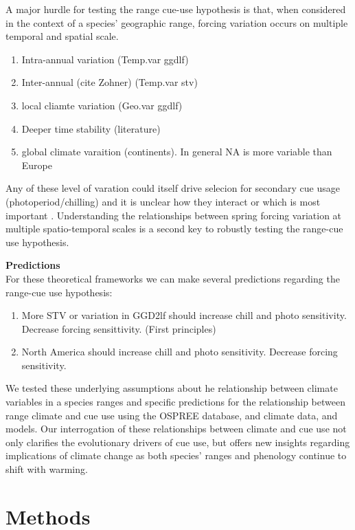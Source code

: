 \documentclass[12pt]{article}\usepackage[]{graphicx}\usepackage[]{color}
\begin{document}
A major hurdle for testing the range cue-use hypothesis is that, when considered in the context of a species' geographic range, forcing variation occurs on multiple temporal and spatial scale.
\begin{enumerate}
\item Intra-annual variation (Temp.var ggdlf)
\item Inter-annual (cite Zohner) (Temp.var stv)
\item local cliamte variation (Geo.var ggdlf)
\item Deeper time stability \citep{} (literature)
\item global climate varaition (continents). In general NA is more variable than Europe
\end{enumerate}

 Any of these level of varation could itself drive selecion for secondary cue usage (photoperiod/chilling) and it is unclear how they interact or which is most important \citep{Zagmajster:2014aa}. Understanding the relationships between spring forcing variation at multiple spatio-temporal scales is a second key to robustly testing the range-cue use hypothesis.


\textbf{Predictions}\\
For these theoretical frameworks we can make several predictions regarding the range-cue use hypothesis:\\
\begin{enumerate}
\item More STV or variation in GGD2lf should increase chill and photo sensitivity. Decrease forcing sensittivity. (First principles)
\item North America should increase chill and photo sensitivity. Decrease forcing sensitivity.
\end{enumerate}

We tested these underlying assumptions about he relationship between climate variables in a species ranges and specific predictions for the relationship between range climate and cue use using the OSPREE database, and climate data, and models. Our interrogation of these relationships between climate and cue use not only clarifies the evolutionary drivers of cue use, but offers new insights regarding implications of climate change as both species' ranges and phenology continue to shift with warming.

\section*{Methods}
\end{document}

